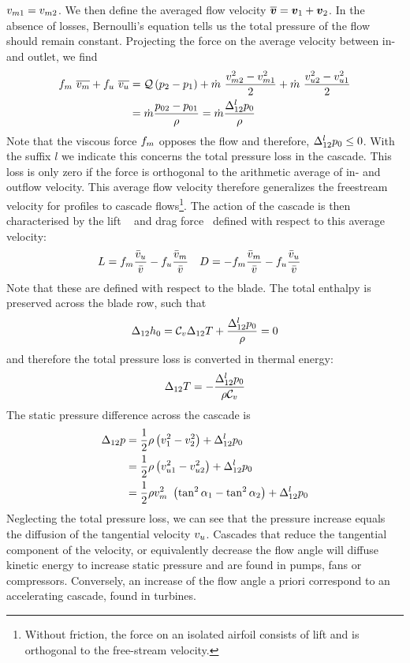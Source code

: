 $v_{m1} = v_{m2}$. We then define the averaged flow velocity
$\overline {\boldsymbol {v}} = \boldsymbol {v}_1 + \boldsymbol {v}_2$. In the absence of losses,
Bernoulli's equation tells us the total pressure of the flow should
remain constant. Projecting the force on the average velocity between
in- and outlet, we find
\begin{align*}
  f_m ~ \overline{v_{m}} + 
  f_{u} ~ \overline{v_{u }} &=
  \mathcal Q \left( p_2 - p_1\right) + 
  \dot m ~\frac{v_{m2}^2 - v_{m1}^2}{2} + 
  \dot m ~\frac{v_{u 2}^2 - v_{u 1}^2}{2} \\
  &= \dot m \frac{p_{02} - p_{01}}{\rho} = \dot m \frac{\Delta_{12}^l p_{0}}{\rho}
\end{align*}
Note that the viscous force $f_m$ opposes the flow and therefore,
$\Delta_{12}^l p_{0} \leq 0$. With the suffix $l$ we indicate this
concerns the total pressure loss in the cascade. This loss is only
zero if the force is orthogonal to the arithmetic average of in- and
outflow velocity. This average flow velocity therefore generalizes the
freestream velocity for profiles to cascade flows\footnote{Without
  friction, the force on an isolated airfoil consists of lift and is
  orthogonal to the free-stream velocity.}. The action of the cascade
is then characterised by the lift \lift~ and drag force \drag~defined
with respect to this average velocity:
\begin{align*}
  L &=  
  f_m \frac{\bar {v}_{u}}{\bar {v}} -
  f_{u} \frac{\bar {v}_m}{\bar {v}}  &
  D &= -
  f_m \frac{\bar {v}_m}{\bar {v}} -
  f_{u} \frac{\bar {v}_{u}}{\bar {v}}
\end{align*}
Note that these are defined with respect to the blade.  The total
enthalpy is preserved across the blade row, such that
\begin{align*}
  \Delta_{12} h_{0} = \mathcal C_v \Delta_{12} T + \frac{\Delta_{12}^l
    p_{0}}{\rho} = 0
\end{align*}
and therefore the total pressure loss is converted in thermal energy:
\begin{align*}
  \Delta_{12} T = - \frac{\Delta_{12}^l p_{0}}{\rho \mathcal C_v}
\end{align*}
The static pressure difference across the cascade is
\begin{align*}
  \Delta_{12} p &= \frac{1}{2} \rho
  \left(v_{1}^2 - v_{2}^2\right) + \Delta_{12}^l p_{0} \\
  &= \frac{1}{2} \rho
  \left(v_{u 1}^2 - v_{u 2}^2\right) + \Delta_{12}^l p_{0} \\
  &= \frac{1}{2} \rho v_m^2~\left(\tan^2 \alpha_1 - \tan^2
    \alpha_2\right) + \Delta_{12}^l p_{0}
\end{align*}
Neglecting the total pressure loss, we can see that the pressure
increase equals the diffusion of the tangential velocity
$v_{u}$. Cascades that reduce the tangential component of the
velocity, or equivalently decrease the flow angle will diffuse kinetic
energy to increase static pressure and are found in pumps, fans or
compressors. Conversely, an increase of the flow angle a priori
correspond to an accelerating cascade, found in turbines.

